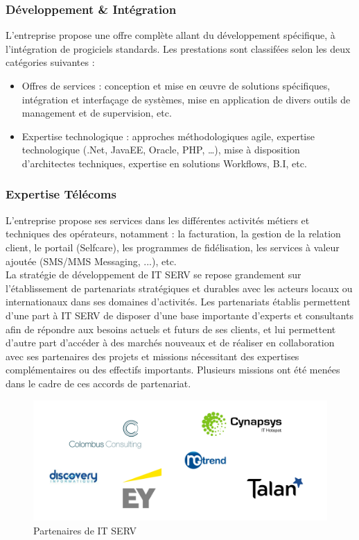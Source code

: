 \begin{spacing}{1.5}
\subsubsection*{Développement \& Intégration} %
L'entreprise propose une offre complète allant du développement spécifique, à l’intégration de progiciels standards. Les prestations sont classifées selon les deux catégories suivantes :
\begin{itemize}
    \item Offres de services : conception et mise en œuvre de solutions spécifiques, intégration et interfaçage de systèmes, mise en application de divers outils de management et de supervision, etc.
    \item Expertise technologique : approches méthodologiques agile, expertise technologique (.Net, JavaEE, Oracle, PHP, …), mise à disposition d'architectes techniques, expertise en solutions Workflows, B.I, etc.
\end{itemize}
\subsubsection*{Expertise Télécoms} %
L'entreprise propose ses services dans les différentes activités métiers et techniques des opérateurs, notamment : la facturation, la gestion de la relation client, le portail (Selfcare), les programmes de fidélisation, les services à valeur ajoutée (SMS/MMS Messaging, ...), etc.
\\

La stratégie de développement de IT SERV se repose grandement sur l’établissement de partenariats stratégiques et durables avec les acteurs locaux ou internationaux dans ses domaines d’activités. Les partenariats établis permettent d’une part à IT SERV de disposer d’une base importante d’experts et consultants afin de répondre aux besoins actuels et futurs de ses clients, et lui permettent d’autre part d’accéder à des marchés nouveaux et de réaliser en collaboration avec ses partenaires des projets et missions nécessitant des expertises complémentaires ou des effectifs importants. Plusieurs missions ont été menées dans le cadre de ces accords de partenariat.

\begin{figure}[!ht]
\centering
\includegraphics[scale=0.8]{partenaires.png}
\caption{Partenaires de IT SERV}
\label{fig:partenaires}
\end{figure}
\


\end{spacing}
